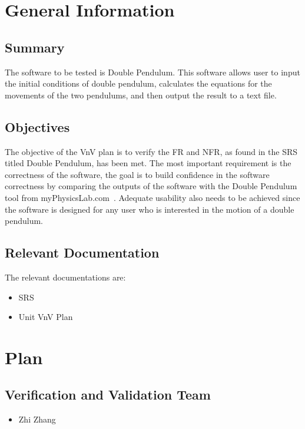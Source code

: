 \documentclass[12pt, titlepage]{article}
\begin{document}
\section{General Information}\label{sec_generalInfo}

\subsection{Summary}

The software to be tested is Double Pendulum. This software allows user to input the initial conditions of double pendulum, calculates the equations for the movements of the two pendulums, and then output the result to a text file. 

\subsection{Objectives}

The objective of the VnV plan is to verify the FR and NFR, as found in the SRS titled Double Pendulum, has been met. The most important requirement is the correctness of the software, the goal is to build confidence in the software correctness by comparing the outputs of the software with the Double Pendulum tool from myPhysicsLab.com~\cite{Double_Pendulum}. Adequate usability also needs to be achieved since the software is designed for any user who is interested in the motion of a double pendulum. 
 
\subsection{Relevant Documentation}

The relevant documentations are:
\begin{itemize}
    \item SRS
    \item Unit VnV Plan
\end{itemize}

\section{Plan}\label{sec_Plan}
	

\subsection{Verification and Validation Team}

\begin{itemize}
    \item Zhi Zhang
\end{itemize}
\end{document}

